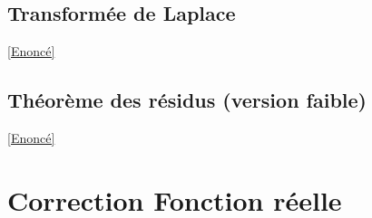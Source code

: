 \documentclass{book}
\begin{document}
	\subsection{Transformée de Laplace}\label{sec:transformee-de-laplace}
	\textcolor{blue}{\hyperref[laplace]{[Enoncé]}}\\
	
	
	\subsection{Théorème des résidus (version faible)}\label{sec:theoreme-des-residus-version-faible}
	\textcolor{blue}{\hyperref[residus]{[Enoncé]}}\\
	
	\newpage
\section{Correction Fonction réelle}
\end{document}
